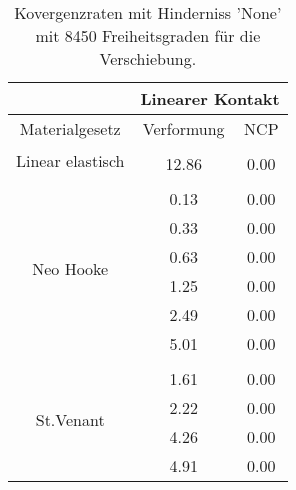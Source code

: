 \begin{table} 
\centering 
\begin{tabular}{c|cc|} 
\cline{2-3} 
 & \multicolumn{2}{|c|}{Linearer Kontakt} \\ 
\hline 
\multicolumn{1}{|c|}{Materialgesetz} & \multicolumn{1}{c|}{Verformung} & \multicolumn{1}{c|}{NCP} \\ 
\hline 
\multicolumn{1}{|c|}{\multirow{2}{*}{Linear elastisch}} &\multicolumn{1}{|c|}{} & \multicolumn{1}{|c|}{} \\ 
\multicolumn{1}{|c|}{} & \multicolumn{1}{|c|}{     12.86} & \multicolumn{1}{|c|}{      0.00} \\ 
\hline 
\multicolumn{1}{|c|}{\multirow{7}{*}{Neo Hooke}} &\multicolumn{1}{|c|}{} & \multicolumn{1}{|c|}{} \\ 
\multicolumn{1}{|c|}{} & \multicolumn{1}{|c|}{      0.13} & \multicolumn{1}{|c|}{      0.00} \\ 
\multicolumn{1}{|c|}{} & \multicolumn{1}{|c|}{      0.33} & \multicolumn{1}{|c|}{      0.00} \\ 
\multicolumn{1}{|c|}{} & \multicolumn{1}{|c|}{      0.63} & \multicolumn{1}{|c|}{      0.00} \\ 
\multicolumn{1}{|c|}{} & \multicolumn{1}{|c|}{      1.25} & \multicolumn{1}{|c|}{      0.00} \\ 
\multicolumn{1}{|c|}{} & \multicolumn{1}{|c|}{      2.49} & \multicolumn{1}{|c|}{      0.00} \\ 
\multicolumn{1}{|c|}{} & \multicolumn{1}{|c|}{      5.01} & \multicolumn{1}{|c|}{      0.00} \\ 
\hline 
\multicolumn{1}{|c|}{\multirow{5}{*}{St.Venant}} &\multicolumn{1}{|c|}{} & \multicolumn{1}{|c|}{} \\ 
\multicolumn{1}{|c|}{} & \multicolumn{1}{|c|}{      1.61} & \multicolumn{1}{|c|}{      0.00} \\ 
\multicolumn{1}{|c|}{} & \multicolumn{1}{|c|}{      2.22} & \multicolumn{1}{|c|}{      0.00} \\ 
\multicolumn{1}{|c|}{} & \multicolumn{1}{|c|}{      4.26} & \multicolumn{1}{|c|}{      0.00} \\ 
\multicolumn{1}{|c|}{} & \multicolumn{1}{|c|}{      4.91} & \multicolumn{1}{|c|}{      0.00} \\ 
\hline 
\end{tabular}\caption{Kovergenzraten mit Hinderniss 'None' mit 8450 Freiheitsgraden für die Verschiebung.}\label{tab:Rate_None_level5}
\end{table} 
